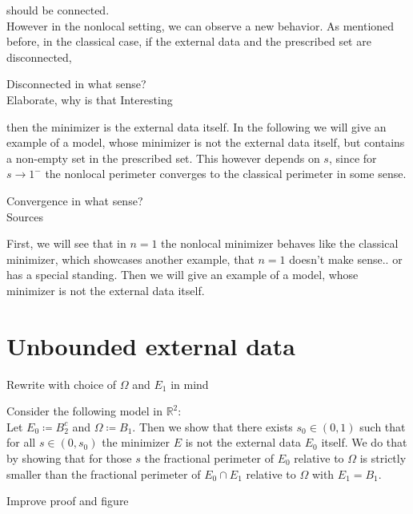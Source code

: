 should be connected. \\
However in the nonlocal setting, we can observe a new behavior. As mentioned before, in
the classical case, if the external data and the prescribed set are disconnected,
\begin{TODO}
	Disconnected in what sense?\\
	Elaborate, why is that Interesting
\end{TODO}
then the minimizer is the external data itself. In the following we will give an example
of a model, whose minimizer is not the external data itself, but contains a non-empty set
in the prescribed set. This however depends on \( s \), since for \( s \to 1^- \) the
nonlocal perimeter converges to the classical perimeter in some sense.
\begin{TODO}
	Convergence in what sense?\\
	Sources
\end{TODO}

First, we will see that in \( n = 1 \) the nonlocal minimizer behaves like the classical
minimizer, which showcases another example, that \( n = 1 \) doesn't make sense.. or has a
special standing. \newline
Then we will give an example of a model, whose minimizer is not the external data itself.


\section{Unbounded external data}
\label{sec:unbounded_external_data}

\begin{TODO}
	Rewrite with choice of \( \Omega \) and \( E_1 \) in mind
\end{TODO}

Consider the following model in \( \mathbb{R}^2 \):\\
Let \( E_0 \coloneqq B_2^c \) and \( \Omega \coloneqq B_1 \). Then we show that there
exists \( s_0 \in (0, 1) \) such that for all \( s \in (0, s_0) \) the minimizer \( E \)
is not the external data \( E_0 \) itself. We do that by showing that for those \( s \)
the fractional perimeter of \( E_0 \) relative to \( \Omega \) is strictly smaller than
the fractional perimeter of \( E_0 \cap E_1 \) relative to \( \Omega \) with \( E_1 = B_1
\).
\begin{TODO}
	Improve proof and figure
\end{TODO}

